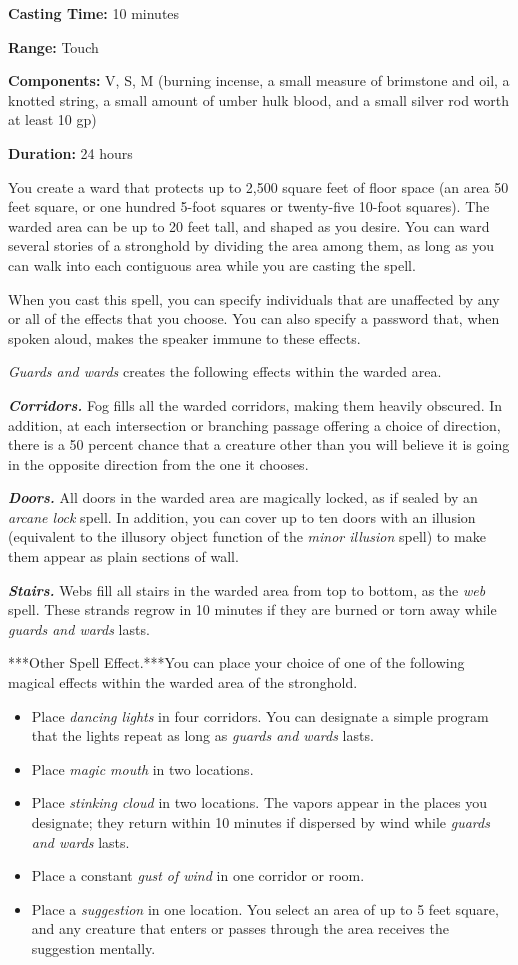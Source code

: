 \documentclass[
]{article}
\providecommand{\tightlist}{%
  \setlength{\itemsep}{0pt}\setlength{\parskip}{0pt}}
\begin{document}
\textbf{Casting Time:} 10 minutes

\textbf{Range:} Touch

\textbf{Components:} V, S, M (burning incense, a small measure of
brimstone and oil, a knotted string, a small amount of umber hulk blood,
and a small silver rod worth at least 10 gp)

\textbf{Duration:} 24 hours

You create a ward that protects up to 2,500 square feet of floor space
(an area 50 feet square, or one hundred 5-foot squares or twenty-five
10-foot squares). The warded area can be up to 20 feet tall, and shaped
as you desire. You can ward several stories of a stronghold by dividing
the area among them, as long as you can walk into each contiguous area
while you are casting the spell.

When you cast this spell, you can specify individuals that are
unaffected by any or all of the effects that you choose. You can also
specify a password that, when spoken aloud, makes the speaker immune to
these effects.

\emph{Guards and wards} creates the following effects within the warded
area.

\emph{\textbf{Corridors.}} Fog fills all the warded corridors, making
them heavily obscured. In addition, at each intersection or branching
passage offering a choice of direction, there is a 50 percent chance
that a creature other than you will believe it is going in the opposite
direction from the one it chooses.

\emph{\textbf{Doors.}} All doors in the warded area are magically
locked, as if sealed by an \emph{arcane lock} spell. In addition, you
can cover up to ten doors with an illusion (equivalent to the illusory
object function of the \emph{minor illusion} spell) to make them appear
as plain sections of wall.

\emph{\textbf{Stairs.}} Webs fill all stairs in the warded area from top
to bottom, as the \emph{web} spell. These strands regrow in 10 minutes
if they are burned or torn away while \emph{guards and wards} lasts.

***Other Spell Effect.***You can place your choice of one of the
following magical effects within the warded area of the stronghold.

\begin{itemize}
\tightlist
\item
  Place \emph{dancing lights} in four corridors. You can designate a
  simple program that the lights repeat as long as \emph{guards and
  wards} lasts.
\item
  Place \emph{magic mouth} in two locations.
\item
  Place \emph{stinking cloud} in two locations. The vapors appear in the
  places you designate; they return within 10 minutes if dispersed by
  wind while \emph{guards and wards} lasts.
\item
  Place a constant \emph{gust of wind} in one corridor or room.
\item
  Place a \emph{suggestion} in one location. You select an area of up to
  5 feet square, and any creature that enters or passes through the area
  receives the suggestion mentally.
\end{itemize}
\end{document}
